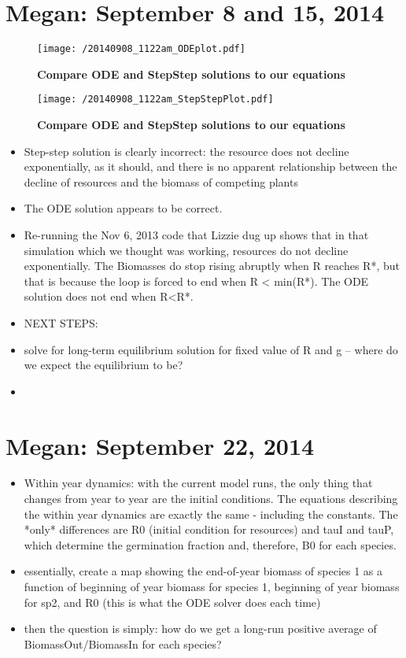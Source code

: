 \documentclass[11pt,a4paper,oneside]{article}
\begin{document}
\section{Megan: September 8 and  15, 2014}
\begin{figure}[h!]
\centering
\noindent \texttt{[image: /20140908\_1122am\_ODEplot.pdf]}
\caption{{\bf Compare ODE and StepStep solutions to our equations}}
\end{figure}

\begin{figure}[h!]
\centering
\noindent \texttt{[image: /20140908\_1122am\_StepStepPlot.pdf]}
\caption{{\bf Compare ODE and StepStep solutions to our equations}}
\end{figure}

\begin{itemize}
\item Step-step solution is clearly incorrect: the resource does not decline exponentially, as it should, and there is no apparent relationship between the decline of resources and the biomass of competing plants
\item The ODE solution appears to be correct.
\item Re-running the Nov 6, 2013 code that Lizzie dug up shows that in that simulation which we thought was working, resources do not decline exponentially.  The Biomasses do stop rising abruptly when R reaches R*, but that is because the loop is forced to end when R < min(R*).  The ODE solution does not end when R<R*.
\item NEXT  STEPS: 
\item solve for long-term equilibrium solution for fixed value of R and g -- where do we expect the equilibrium to be?
\item 
\end{itemize}

\section{Megan: September 22, 2014}
\begin{itemize}
\item Within year dynamics: with the current model runs, the only thing that changes from year to year are the initial conditions.  The equations describing the within year dynamics are exactly the same - including the constants.  The *only* differences are R0 (initial condition for resources) and tauI and tauP, which determine the germination fraction and, therefore, B0 for each species.
\item essentially, create a map showing the end-of-year biomass of species 1 as a function of beginning of year biomass for species 1, beginning of year biomass for sp2, and R0 (this is what the ODE solver does each time)
\item then the question is simply: how do we get a long-run positive average of BiomassOut/BiomassIn for each species?  
\end{itemize}
\end{document}
